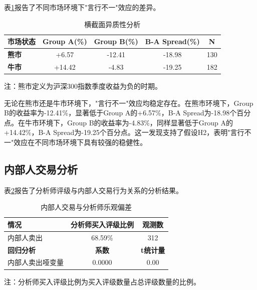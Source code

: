 \documentclass[12pt,a4paper]{article}
\begin{document}
表\ref{tab:heterogeneity}报告了不同市场环境下"言行不一"效应的差异。

\begin{table}[htbp]
  \centering
  \caption{横截面异质性分析}
  \label{tab:heterogeneity}
  \begin{threeparttable}
    \begin{tabular}{lcccc}
      \toprule
      \textbf{市场状态} & \textbf{Group A(\%)} & \textbf{Group B(\%)} & \textbf{B-A Spread(\%)} & \textbf{N} \\
      \midrule
      \textbf{熊市} & +6.57 & -12.41 & -18.98 & 130 \\
      \textbf{牛市} & +14.42 & -4.83 & -19.25 & 182 \\
      \bottomrule
    \end{tabular}
    \begin{tablenotes}
      \footnotesize
      \item 注：熊市定义为沪深300指数季度收益为负的时期。
    \end{tablenotes}
  \end{threeparttable}
\end{table}

无论在熊市还是牛市环境下，"言行不一"效应均稳定存在。在熊市环境下，Group B的收益率为-12.41\%，显著低于Group A的+6.57\%，B-A Spread为-18.98个百分点。在牛市环境下，Group B的收益率为-4.83\%，同样显著低于Group A的+14.42\%，B-A Spread为-19.25个百分点。这一发现支持了假设H2，表明"言行不一"效应在不同市场环境下具有较强的稳健性。

\subsection{内部人交易分析}

表\ref{tab:insider}报告了分析师评级与内部人交易行为关系的分析结果。

\begin{table}[htbp]
  \centering
  \caption{内部人交易与分析师乐观偏差}
  \label{tab:insider}
  \begin{threeparttable}
    \begin{tabular}{lcc}
      \toprule
      \textbf{情况} & \textbf{分析师买入评级比例} & \textbf{观测数} \\
      \midrule
      内部人卖出 & 68.59\% & 312 \\
      \midrule
      \textbf{回归分析} & \textbf{系数} & \textbf{t统计量} \\
      \midrule
      内部人卖出哑变量 & 0.0000 & 0.00 \\
      \bottomrule
    \end{tabular}
    \begin{tablenotes}
      \footnotesize
      \item 注：分析师买入评级比例为买入评级数量占总评级数量的比例。
    \end{tablenotes}
  \end{threeparttable}
\end{table}
\end{document}
